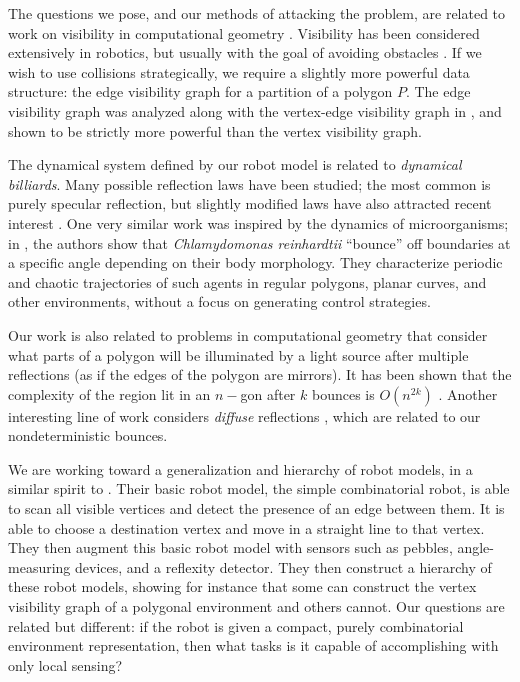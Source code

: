 \documentclass[]{styles/svproc}  %
\begin{document}
The questions we pose, and our methods of attacking the problem, are related to
work on visibility in computational geometry \cite{ghosh2007visibility}. Visibility has been
considered extensively in robotics, but usually with the goal of avoiding obstacles 
\cite{lozano1979algorithm,nissoux1999visibility}. If we wish to use collisions strategically, 
we require a slightly more
powerful data structure: the edge visibility graph for a partition of a polygon
$P$. The edge visibility graph was analyzed along with the vertex-edge
visibility graph in \cite{rourke_viz}, and shown to be strictly more powerful
than the vertex visibility graph.


The dynamical system defined by our robot model is related to \emph{dynamical billiards}. Many 
possible reflection laws have been studied;
the most common is purely specular reflection, but slightly modified laws have
also attracted recent interest \cite{DelMagno2014,billiards,pinball}. 
One very similar work was inspired by the dynamics of microorganisms; in \cite{microorganism2017}, 
the authors show that 
\textit{Chlamydomonas reinhardtii} ``bounce'' off boundaries at a specific
angle depending on their body morphology. They characterize periodic and
chaotic trajectories of such agents in regular polygons, planar curves, and other environments, 
without a focus on generating control strategies.

Our work is also related to problems in computational geometry that consider what
parts of a polygon will be illuminated by a light source after multiple
reflections (as if the edges of the polygon are mirrors). It has been shown that
the complexity of the region lit in an $n-$gon after $k$ bounces is $O(n^{2k})$
\cite{Aronov1996}. Another interesting line of work considers \emph{diffuse}
reflections \cite{prasad1998visibility}, which are related to our nondeterministic bounces.

We are working toward a generalization and hierarchy of robot models, in a
similar spirit to \cite{brunner2008simple}. Their basic robot model, the simple
combinatorial robot, is able to scan all visible vertices and detect the
presence of an edge between them. It is able to choose a destination vertex and
move in a straight line to that vertex. They then augment this basic robot model
with sensors such as pebbles, angle-measuring devices, and a reflexity detector.
They then construct a hierarchy of these robot models, showing for instance that
some can construct the vertex visibility graph of a polygonal environment
and others cannot. Our questions are related but different: if the robot is
given a compact, purely combinatorial environment representation, then what tasks is 
it capable of accomplishing with only local sensing?
\end{document}
